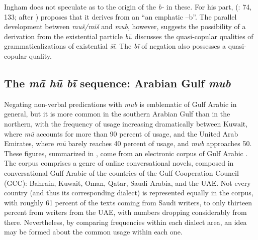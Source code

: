 \documentclass[output=paper,colorlinks,citecolor=brown]{langscibook}
\begin{document}
Ingham does not speculate as to the origin of the \textit{b-} in these. For his part, \citeauthor{binturki2015a} (\citeyear{binturki2015a}: 74, 133; after \citealp{matar1976a}) proposes that it derives from an “an emphatic –b”. The parallel development between \textit{muš/miš} and \textit{mub}, however, suggests the possibility of a derivation from the existential particle \textit{bī}. \citet[288--289]{wilmsen2017a} discusses the quasi-copular qualities of grammaticalizations of existential \textit{šī}. The \textit{bī} of negation also possesses a quasi-copular quality.

\subsection{The \textit{mā hū bī} sequence: Arabian Gulf \textit{mub}} \label{s:WiAR-4.5}

Negating non-verbal predications with \textit{mub} is emblematic of Gulf Arabic in general, but it is more common in the southern Arabian Gulf than in the northern, with the frequency of usage increasing dramatically between Kuwait, where \textit{mū} accounts for more than 90 percent of usage, and the United Arab Emirates, where \textit{mū} barely reaches 40 percent of usage, and \textit{mub} approaches 50. These figures, summarized in , come from an electronic corpus of Gulf Arabic \citep{khalifa2016a}. The corpus comprises a genre of online conversational novels, composed in conversational Gulf Arabic of the countries of the Gulf Cooperation Council (GCC): Bahrain, Kuwait, Oman, Qatar, Saudi Arabia, and the UAE. Not every country (and thus its corresponding dialect) is represented equally in the corpus, with roughly 61 percent of the texts coming from Saudi writers, to only thirteen percent from writers from the UAE, with numbers dropping considerably from there. Nevertheless, by comparing frequencies within each dialect area, an idea may be formed about the common usage within each one.
\end{document}
